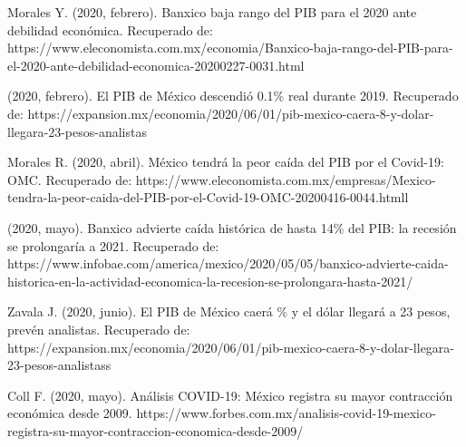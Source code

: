 \documentclass[a4paper]{article}
\begin{document}
\begin{thebibliography}{99}

 Morales Y. (2020, febrero). Banxico baja rango del PIB para el 2020 ante debilidad económica. Recuperado de: https://www.eleconomista.com.mx/economia/Banxico-baja-rango-del-PIB-para-el-2020-ante-debilidad-economica-20200227-0031.html

 (2020, febrero). El PIB de México descendió 0.1\% real durante 2019. Recuperado de: https://expansion.mx/economia/2020/06/01/pib-mexico-caera-8-y-dolar-llegara-23-pesos-analistas

 Morales R. (2020, abril). México tendrá la peor caída del PIB por el Covid-19: OMC. Recuperado de: https://www.eleconomista.com.mx/empresas/Mexico-tendra-la-peor-caida-del-PIB-por-el-Covid-19-OMC-20200416-0044.htmll

 (2020, mayo). Banxico advierte caída histórica de hasta 14\% del PIB: la recesión se prolongaría a 2021. Recuperado de: https://www.infobae.com/america/mexico/2020/05/05/banxico-advierte-caida-historica-en-la-actividad-economica-la-recesion-se-prolongara-hasta-2021/

 Zavala J. (2020, junio). El PIB de México caerá \% y el dólar llegará a 23 pesos, prevén analistas. Recuperado de: https://expansion.mx/economia/2020/06/01/pib-mexico-caera-8-y-dolar-llegara-23-pesos-analistass

 Coll F. (2020, mayo). Análisis COVID-19: México registra su mayor contracción económica desde 2009. https://www.forbes.com.mx/analisis-covid-19-mexico-registra-su-mayor-contraccion-economica-desde-2009/

\end{thebibliography}
\end{document}
